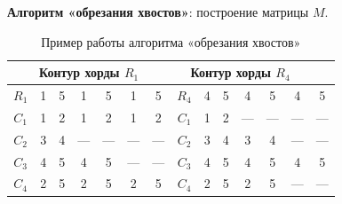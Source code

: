 	\textbf{Алгоритм «обрезания хвостов»}: построение матрицы $M$.
	
	\begin{table}[H]
		\centering
		\caption{Пример работы алгоритма «обрезания хвостов»}
		\begin{tabular}{|c|cc|cc|cc||c|cc|cc|cc|}
			\hline
			\multicolumn{7}{c||}{Контур хорды $R_1$} & \multicolumn{6}{c|}{Контур хорды $R_4$} \\
			\hline
			$R_1$ & 1 & 5 & 1 & 5 & 1 & 5 & $R_4$ & 4 & 5 & 4 & 5 & 4 & 5 \\
			$C_1$ & 1 & 2 & 1 & 2 & 1 & 2 & $C_1$ & 1 & 2 & — & — & — & — \\
			$C_2$ & 3 & 4 & — & — & — & — & $C_2$ & 3 & 4 & 3 & 4 & — & — \\
			$C_3$ & 4 & 5 & 4 & 5 & — & — & $C_3$ & 4 & 5 & 4 & 5 & 4 & 5 \\
			$C_4$ & 2 & 5 & 2 & 5 & 2 & 5 & $C_4$ & 2 & 5 & 2 & 5 & — & — \\
			\hline
		\end{tabular}
	\end{table}
